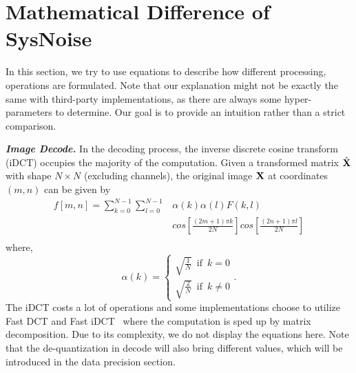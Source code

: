\section{Mathematical Difference of SysNoise}
\label{appendix_math}
In this section, we try to use equations to describe how different processing, operations are formulated. Note that our explanation might not be exactly the same with third-party implementations, as there are always some hyper-parameters to determine. Our goal is to provide an intuition rather than a strict comparison. 

\textbf{\emph{Image Decode.}} In the decoding process, the inverse discrete cosine transform (iDCT) occupies the majority of the computation. Given a transformed matrix $\hat{{\mathbf{X}}}$ with shape $N\times N$ (excluding channels), the original image ${\mathbf{X}}$ at coordinates $(m, n)$ can be given by
\begin{equation}
\begin{split}
  f[m,n]=\sum_{k=0}^{N-1}\sum_{l=0}^{N-1}&\alpha(k)\alpha(l)F(k,l)\\
  &cos[\frac{(2m+1){\pi}k}{2N}]cos[\frac{(2n+1){\pi}l}{2N}] \\
\end{split}
\end{equation}
where,
\begin{equation}
  \alpha(k)= \begin{cases}
  \sqrt{\frac{1}{N}} \, \text{  if  } \, k = 0 \\
  \sqrt{\frac{2}{N}} \, \text{  if  } \, k \neq 0
  \end{cases}.
\end{equation}
The iDCT costs a lot of operations and some implementations choose to utilize Fast DCT and Fast iDCT~\cite{chen1977fast} where the computation is sped up by matrix decomposition. Due to its complexity, we do not display the equations here. Note that the de-quantization in decode will also bring different values, which will be introduced in the data precision section. 

